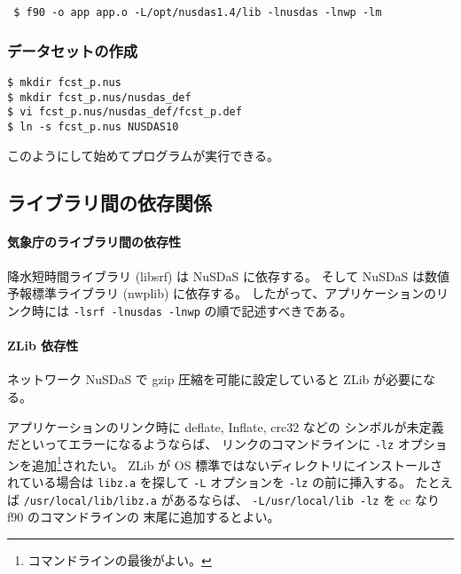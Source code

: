 \begin{screen}
\begin{verbatim}
 $ f90 -o app app.o -L/opt/nusdas1.4/lib -lnusdas -lnwp -lm
\end{verbatim}
\end{screen}

\subsubsection*{データセットの作成}

\begin{screen}
\begin{verbatim}
$ mkdir fcst_p.nus
$ mkdir fcst_p.nus/nusdas_def
$ vi fcst_p.nus/nusdas_def/fcst_p.def
$ ln -s fcst_p.nus NUSDAS10
\end{verbatim}
\end{screen}

このようにして始めてプログラムが実行できる。

\subsection{ライブラリ間の依存関係}

\paragraph{気象庁のライブラリ間の依存性}

降水短時間ライブラリ (libsrf) は NuSDaS に依存する。
そして NuSDaS は数値予報標準ライブラリ (nwplib) に依存する。
したがって、アプリケーションのリンク時には
\verb|-lsrf -lnusdas -lnwp|
の順で記述すべきである。

\paragraph{ZLib 依存性}

ネットワーク NuSDaS で gzip 圧縮を可能に設定していると
ZLib が必要になる。

アプリケーションのリンク時に deflate, Inflate, crc32 などの
シンボルが未定義だといってエラーになるようならば、
リンクのコマンドラインに \verb|-lz| オプションを追加\footnote{
	コマンドラインの最後がよい。
}されたい。
ZLib が OS 標準ではないディレクトリにインストールされている場合は
\verb|libz.a| を探して \verb|-L| オプションを \verb|-lz| の前に挿入する。
たとえば \verb|/usr/local/lib/libz.a| があるならば、
\verb|-L/usr/local/lib -lz| を cc なり f90 のコマンドラインの
末尾に追加するとよい。

